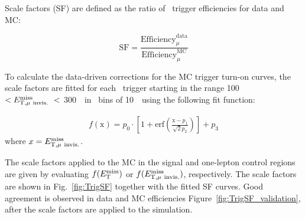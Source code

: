 \par Scale factors (SF) are defined as the ratio of \MET~trigger efficiencies for data and MC:

\begin{equation}
	\label{eq:dataMCsf}
	\text{SF} = \frac{\text{Efficiency}^{\text{data}}_{\mu}}{\text{Efficiency}^{\text{MC}}_{\mu}}
\end{equation}

To calculate the data-driven corrections for the MC trigger turn-on curves, the scale factors are fitted for each \MET~trigger starting in the range 100~\GeV~$< E_{\mathrm{T, \mu~invis.}}^{\mathrm{miss}}~<$ 300~\GeV~in \MET~bins of 10~\GeV~using the following fit function:

\begin{eqnarray}
	\label{eq:dataMCsf_fit}
	f\left(\text{x}\right) = p_0 \cdot \left[1 + \text{erf}\left(\frac{\text{x} - p_{1}}{\sqrt{2}p_{2}}\right)\right] + p_3
\end{eqnarray}
where $x = E_{\mathrm{T, \mu~invis.}}^{\mathrm{miss}}$.

\par The scale factors applied to the MC in the signal and one-lepton control regions are given by evaluating $f(E_{\mathrm{T}}^{\mathrm{miss}})$ or $f(E_{\mathrm{T, \mu~invis.}}^{\mathrm{miss}})$, respectively. 
The scale factors are shown in Fig.~\ref{fig:TrigSF} together with the fitted SF curves.
Good agreement is observed in data and MC efficiencies Figure~\ref{fig:TrigSF_validation}, after the scale factors are applied to the simulation.

